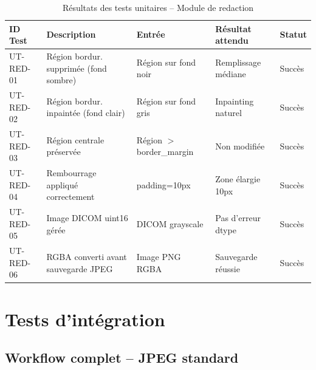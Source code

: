 \begin{table}[H]
\centering
\caption{Résultats des tests unitaires -- Module de redaction}
\label{tab:tests_redaction}
\begin{tabularx}{\textwidth}{p{2.2cm} X p{3.5cm} p{1.5cm} p{1.2cm}}
\toprule
\textbf{ID Test} & \textbf{Description} & \textbf{Entrée} & \textbf{Résultat attendu} & \textbf{Statut} \\
\midrule
UT-RED-01 & Région bordur. supprimée (fond sombre)  & Région sur fond noir  & Remplissage médiane & \textcolor{green!60!black}{Succès} \\
UT-RED-02 & Région bordur. inpaintée (fond clair)   & Région sur fond gris  & Inpainting naturel & \textcolor{green!60!black}{Succès} \\
UT-RED-03 & Région centrale préservée               & Région $>$ border\_margin & Non modifiée & \textcolor{green!60!black}{Succès} \\
UT-RED-04 & Rembourrage appliqué correctement       & padding=10px          & Zone élargie 10px & \textcolor{green!60!black}{Succès} \\
UT-RED-05 & Image DICOM uint16 gérée                & DICOM grayscale       & Pas d'erreur dtype & \textcolor{green!60!black}{Succès} \\
UT-RED-06 & RGBA converti avant sauvegarde JPEG     & Image PNG RGBA        & Sauvegarde réussie & \textcolor{green!60!black}{Succès} \\
\bottomrule
\end{tabularx}
\end{table}

\section{Tests d'intégration}

\subsection{Workflow complet -- JPEG standard}

